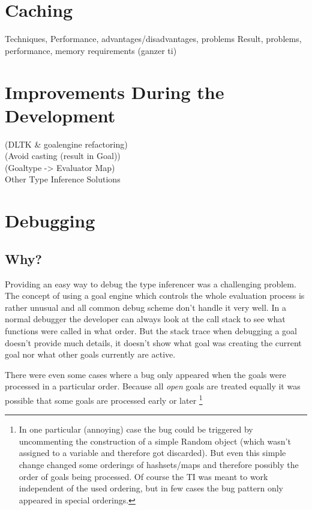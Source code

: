 \documentclass[12pt,halfparskip]{scrreprt}
\begin{document}

\section{Caching}
 Techniques, Performance, advantages/disadvantages, problems
 Result, problems, performance, memory requirements (ganzer ti)


\section{Improvements During the Development}

 (DLTK \& goalengine refactoring) \\
 (Avoid casting (result in Goal))\\
 (Goaltype -> Evaluator Map)\\
Other Type Inference Solutions


\section{Debugging}

\subsection{Why?}

Providing an easy way to debug the type inferencer was a challenging problem. The concept of using a goal engine which controls the whole evaluation process is rather unusual and all common debug scheme don't handle it very well. In a normal debugger the developer can always look at the call stack to see what functions were called in what order. But the stack trace when debugging a goal doesn't provide much details, it doesn't show what goal was creating the current goal nor what other goals currently are active.

There were even some cases where a bug only appeared when the goals were processed in a particular order. Because all \emph{open} goals are treated equally it was possible that some goals are processed early or later
\footnote{In one particular (annoying) case the bug could be triggered by uncommenting the construction of a simple Random object (which wasn't assigned to a variable and therefore got discarded). But even this simple change changed some orderings of hashsets/maps and therefore possibly the order of goals being processed. Of course the TI was meant to work independent of the used ordering, but in few cases the bug pattern only appeared in special orderings.}
\end{document}
